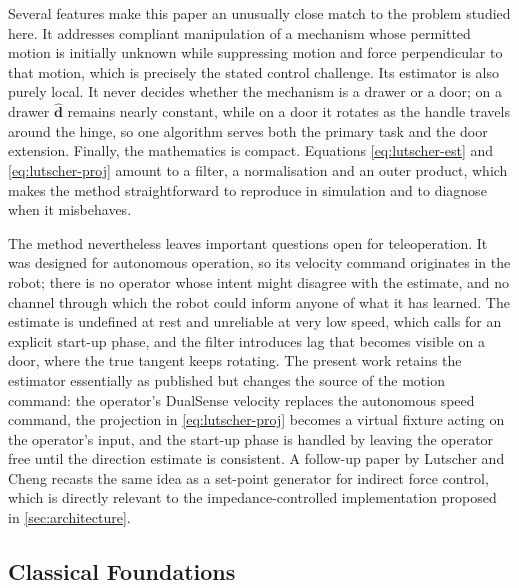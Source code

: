 \documentclass[11pt,letterpaper]{article}
\newcommand{\vect}[1]{\bm{#1}}
\begin{document}
Several features make this paper an unusually close match to the problem studied here. It addresses compliant manipulation of a mechanism whose permitted motion is initially unknown while suppressing motion and force perpendicular to that motion, which is precisely the stated control challenge. Its estimator is also purely local. It never decides whether the mechanism is a drawer or a door; on a drawer $\hat{\vect{d}}$ remains nearly constant, while on a door it rotates as the handle travels around the hinge, so one algorithm serves both the primary task and the door extension. Finally, the mathematics is compact. Equations \eqref{eq:lutscher-est} and \eqref{eq:lutscher-proj} amount to a filter, a normalisation and an outer product, which makes the method straightforward to reproduce in simulation and to diagnose when it misbehaves.

The method nevertheless leaves important questions open for teleoperation. It was designed for autonomous operation, so its velocity command originates in the robot; there is no operator whose intent might disagree with the estimate, and no channel through which the robot could inform anyone of what it has learned. The estimate is undefined at rest and unreliable at very low speed, which calls for an explicit start-up phase, and the filter introduces lag that becomes visible on a door, where the true tangent keeps rotating. The present work retains the estimator essentially as published but changes the source of the motion command: the operator's DualSense velocity replaces the autonomous speed command, the projection in \eqref{eq:lutscher-proj} becomes a virtual fixture acting on the operator's input, and the start-up phase is handled by leaving the operator free until the direction estimate is consistent. A follow-up paper by Lutscher and Cheng \cite{lutscher2012setpoint} recasts the same idea as a set-point generator for indirect force control, which is directly relevant to the impedance-controlled implementation proposed in \cref{sec:architecture}.

\subsection{Classical Foundations}
\label{sec:classical}
\end{document}

